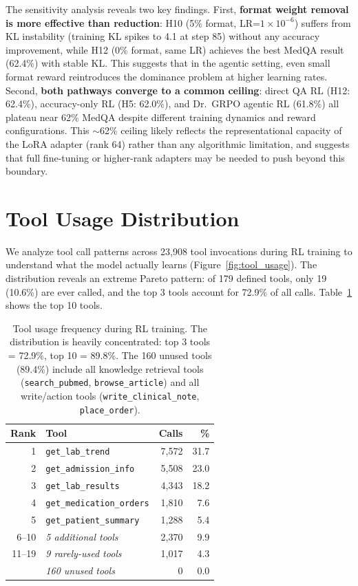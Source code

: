 \documentclass{article}
\begin{document}
The sensitivity analysis reveals two key findings. First, \textbf{format weight removal is more effective than reduction}: H10 (5\% format, LR=$1 \times 10^{-6}$) suffers from KL instability (training KL spikes to 4.1 at step 85) without any accuracy improvement, while H12 (0\% format, same LR) achieves the best MedQA result (62.4\%) with stable KL. This suggests that in the agentic setting, even small format reward reintroduces the dominance problem at higher learning rates. Second, \textbf{both pathways converge to a common ceiling}: direct QA RL (H12: 62.4\%), accuracy-only RL (H5: 62.0\%), and Dr.~GRPO agentic RL (61.8\%) all plateau near 62\% MedQA despite different training dynamics and reward configurations. This $\sim$62\% ceiling likely reflects the representational capacity of the LoRA adapter (rank 64) rather than any algorithmic limitation, and suggests that full fine-tuning or higher-rank adapters may be needed to push beyond this boundary.


\section{Tool Usage Distribution}
\label{app:tool_distribution}

We analyze tool call patterns across 23,908 tool invocations during RL training to understand what the model actually learns (Figure~\ref{fig:tool_usage}). The distribution reveals an extreme Pareto pattern: of 179 defined tools, only 19 (10.6\%) are ever called, and the top 3 tools account for 72.9\% of all calls. Table~\ref{tab:tool_usage} shows the top 10 tools.

\begin{table}[h]
\centering
\caption{Tool usage frequency during RL training. The distribution is heavily concentrated: top 3 tools = 72.9\%, top 10 = 89.8\%. The 160 unused tools (89.4\%) include all knowledge retrieval tools (\texttt{search\_pubmed}, \texttt{browse\_article}) and all write/action tools (\texttt{write\_clinical\_note}, \texttt{place\_order}).}
\label{tab:tool_usage}
\begin{tabular}{rlrr}
\toprule
\textbf{Rank} & \textbf{Tool} & \textbf{Calls} & \textbf{\%} \\
\midrule
1 & \texttt{get\_lab\_trend} & 7,572 & 31.7 \\
2 & \texttt{get\_admission\_info} & 5,508 & 23.0 \\
3 & \texttt{get\_lab\_results} & 4,343 & 18.2 \\
4 & \texttt{get\_medication\_orders} & 1,810 & 7.6 \\
5 & \texttt{get\_patient\_summary} & 1,288 & 5.4 \\
6--10 & \emph{5 additional tools} & 2,370 & 9.9 \\
11--19 & \emph{9 rarely-used tools} & 1,017 & 4.3 \\
\midrule
& \emph{160 unused tools} & 0 & 0.0 \\
\bottomrule
\end{tabular}
\end{table}
\end{document}
